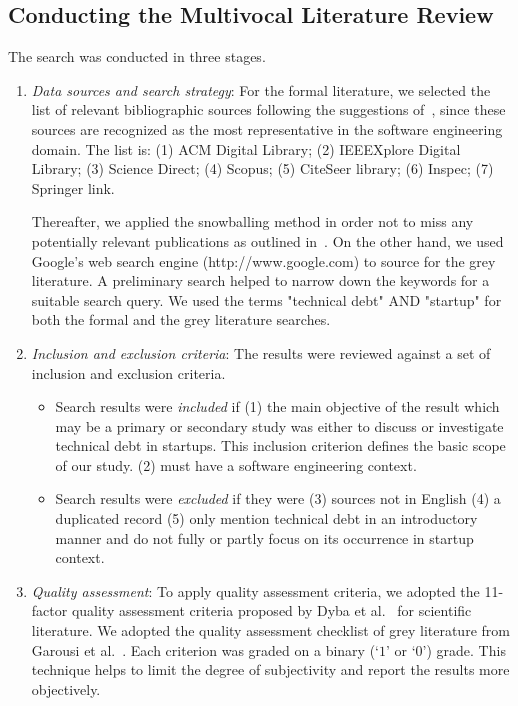 \subsection{Conducting the Multivocal Literature Review}
The search was conducted in three stages.
\begin{enumerate}
\item \emph{Data sources and search strategy}: For the formal literature, we selected the list of relevant bibliographic sources following the suggestions of~\cite{kitchenham2007guidelines}, since these sources are
recognized as the most representative in the software engineering domain.
The list is: (1) ACM Digital Library;  (2) IEEEXplore Digital Library; (3) Science Direct; (4) Scopus; (5) CiteSeer library; (6) Inspec; (7) Springer link.

Thereafter, we applied the snowballing method in order not to miss any potentially relevant publications as outlined in~\cite{Wohlin2014/2601248.2601268}.
On the other hand, we used Google's web search engine (http://www.google.com) to source for the grey literature.
A preliminary search helped to narrow down the keywords for a suitable search query.
We used the terms "technical debt" AND "startup" for both the formal and the grey literature searches.

\item \emph{Inclusion and exclusion criteria}: The results were reviewed against a set of inclusion and exclusion criteria.

\begin{itemize}
\item Search results were \emph{included} if 
(1) the main objective of the result which may be a primary or secondary  study was either to discuss or investigate technical debt in startups.
This inclusion criterion defines the basic scope of our study.
(2) must have a software engineering context.

\item Search results were \emph{excluded} if they were 
(3) sources not in English
(4) a duplicated record 
(5) only mention technical debt in an introductory manner and do not fully or partly focus on its occurrence in startup context.
\end{itemize}

\item \emph{Quality assessment}: To apply quality assessment criteria, we adopted the 11-factor quality
assessment criteria proposed by Dyba et al.~\cite{DYBA2008833} for scientific literature.
We adopted the quality assessment checklist of grey literature from Garousi et al.~\cite{GAROUSI2019101}.
Each criterion was graded on a binary (`$1$' or `$0$') grade.
This technique helps to limit the degree of subjectivity and report the results more objectively. 
\end{enumerate}

